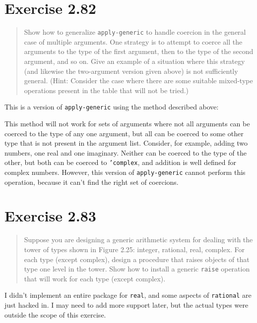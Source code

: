 \documentclass{article}
\begin{document}
\section{Exercise 2.82}
\begin{quote}
    Show how to generalize \texttt{apply-generic} to handle coercion in the
    general case of multiple arguments. One strategy is to attempt to coerce
    all the arguments to the type of the first argument, then to the type of
    the second argument, and so on. Give an example of a situation where this
    strategy (and likewise the two-argument version given above) is not
    sufficiently general. (Hint: Consider the case where there are some
    suitable mixed-type operations present in the table that will not be
    tried.)
\end{quote}

This is a version of \texttt{apply-generic} using the method described above:


This method will not work for sets of arguments where not all arguments can be
coerced to the type of any one argument, but all can be coerced to some other
type that is not present in the argument list. Consider, for example, adding two
numbers, one real and one imaginary. Neither can be coerced to the type of the
other, but both can be coerced to \texttt{'complex}, and addition is well
defined for complex numbers. However, this version of \texttt{apply-generic}
cannot perform this operation, because it can't find the right set of coercions.

\section{Exercise 2.83}
\begin{quote}
    Suppose you are designing a generic arithmetic system for dealing with the
    tower of types shown in Figure 2.25: integer, rational, real, complex. For
    each type (except complex), design a procedure that raises objects of that
    type one level in the tower. Show how to install a generic \texttt{raise}
    operation that will work for each type (except complex).
\end{quote}

I didn't implement an entire package for \texttt{real}, and some aspects of
\texttt{rational} are just hacked in. I may need to add more support later, but
the actual types were outside the scope of this exercise.
\end{document}
